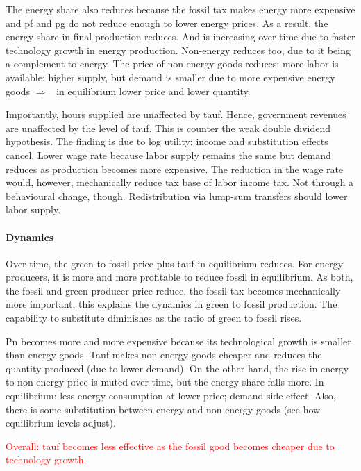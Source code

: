\documentclass[12pt]{article}
\newcommand{\ar}{$\Rightarrow$ \ }
\newcommand{\tr}[1]{\textcolor{red}{#1}}
\begin{document}
The energy share also reduces because the fossil tax makes energy more expensive and pf and pg do not reduce enough to lower energy prices. As a result, the energy share in final production reduces. And is increasing over time due to faster technology growth in energy production. Non-energy reduces too, due to it being a complement to energy. The price of non-energy goods reduces; more labor is available; higher supply, but demand is smaller due to more expensive energy goods \ar in equilibrium lower price and lower quantity. 

Importantly, hours supplied are unaffected by tauf. Hence, government revenues are unaffected by the level of tauf. This is counter the weak double dividend hypothesis. The finding is due to log utility: income and substitution effects cancel. Lower wage rate because labor supply remains the same but demand reduces as production becomes more expensive. The reduction in the wage rate would, however, mechanically reduce tax base of labor income tax. Not through a behavioural change, though. Redistribution via lump-sum transfers should lower labor supply.

\paragraph{Dynamics} Over time, the green to fossil price plus tauf in equilibrium reduces. For energy producers, it is more and more profitable to reduce fossil in equilibrium. As both, the fossil and green producer price reduce, the fossil tax becomes mechanically more important, this explains the dynamics in green to fossil production. The capability to substitute diminishes as the ratio of green to fossil rises. 

Pn becomes more and more expensive because its technological growth is smaller than energy goods. Tauf makes non-energy goods cheaper and reduces the quantity produced (due to lower demand).  
On the other hand, the rise in energy to non-energy price is muted over time, but the energy share falls more. In equilibrium: less energy consumption at lower price; demand side effect. Also, there is some substitution between energy and non-energy goods (see how equilibrium levels adjust). 

\tr{Overall: tauf becomes less effective as the fossil good becomes cheaper due to technology growth. }
\end{document}
